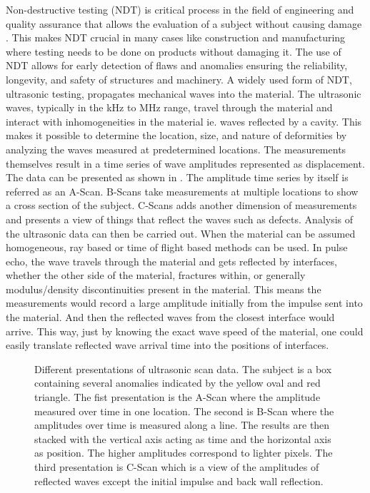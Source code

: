 \noindent Non-destructive testing (NDT) is critical process in the field of engineering and quality assurance that allows the evaluation of a subject without causing damage \autocite{howell2020nondestructive, maioUltrasoundPropagationComposite2022, bochudSparseDigitalSignal2015}. This makes NDT crucial in many cases like construction and manufacturing where testing needs to be done on products without damaging it. The use of NDT allows for early detection of flaws and anomalies ensuring the reliability, longevity, and safety of structures and machinery. A widely used form of NDT, ultrasonic testing, propagates mechanical waves into the material. The ultrasonic waves, typically in the kHz to MHz range, travel through the material and interact with inhomogeneities in the material ie. waves reflected by a cavity. This makes it possible to determine the location, size, and nature of deformities by analyzing the waves measured at predetermined locations. The measurements themselves result in a time series of wave amplitudes represented as displacement. The data can be presented as shown in . The amplitude time series by itself is referred as an A-Scan. B-Scans take measurements at multiple locations to show a cross section of the subject. C-Scans adds another dimension of measurements and presents a view of things that reflect the waves such as defects. Analysis of the ultrasonic data can then be carried out. When the material can be assumed homogeneous, ray based or time of flight based methods can be used. In pulse echo, the wave travels through the material and gets reflected by interfaces, whether the other side of the material, fractures within, or generally modulus/density discontinuities present in the material. This means the measurements would record a large amplitude initially from the impulse sent into the material. And then the reflected waves from the closest interface would arrive. This way, just by knowing the exact wave speed of the material, one could easily translate reflected wave arrival time into the positions of interfaces.

\begin{figure}[ht]
    \centering
    
    \caption{Different presentations of ultrasonic scan data. The subject is a box containing several anomalies indicated by the yellow oval and red triangle. The fist presentation is the A-Scan where the amplitude measured over time in one location. The second is B-Scan where the amplitudes over time is measured along a line. The results are then stacked with the vertical axis acting as time and the horizontal axis as position. The higher amplitudes correspond to lighter pixels. The third presentation is C-Scan which is a view of the amplitudes of reflected waves except the initial impulse and back wall reflection.}
    \label{fig:us_presentation}
\end{figure}


